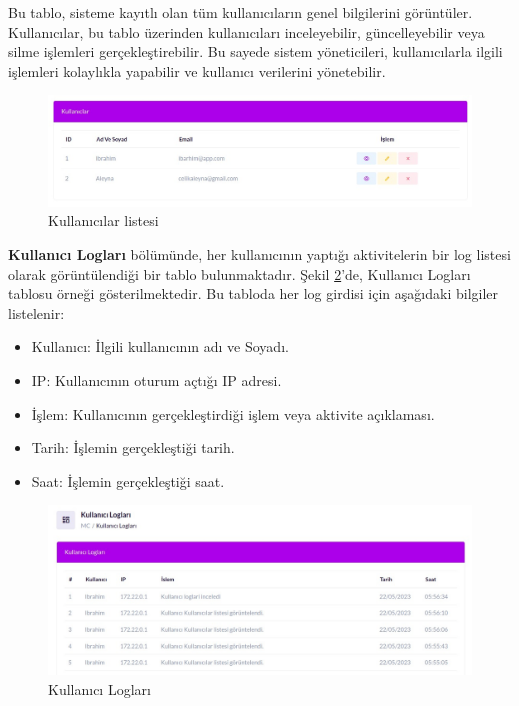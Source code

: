 Bu tablo, sisteme kayıtlı olan tüm kullanıcıların genel bilgilerini görüntüler. Kullanıcılar, bu tablo üzerinden kullanıcıları inceleyebilir, güncelleyebilir veya silme işlemleri gerçekleştirebilir. Bu sayede sistem yöneticileri, kullanıcılarla ilgili işlemleri kolaylıkla yapabilir ve kullanıcı verilerini yönetebilir.
\begin{figure}[ht]
	\centering
	\includegraphics[width=0.7\linewidth]{images/users.jpeg}
	\caption{Kullanıcılar listesi}
	\label{fig:users}
\end{figure}

\textbf{Kullanıcı Logları} bölümünde, her kullanıcının yaptığı aktivitelerin bir log listesi olarak görüntülendiği bir tablo bulunmaktadır. Şekil \ref{fig:log}'de, Kullanıcı Logları tablosu örneği gösterilmektedir.
Bu tabloda her log girdisi için aşağıdaki bilgiler listelenir:
\begin{itemize}
	\item Kullanıcı: İlgili kullanıcının adı ve Soyadı.
	\item IP: Kullanıcının oturum açtığı IP adresi.
	\item İşlem: Kullanıcının gerçekleştirdiği işlem veya aktivite açıklaması.
	\item Tarih: İşlemin gerçekleştiği tarih.
	\item Saat: İşlemin gerçekleştiği saat.
\end{itemize}

\begin{figure}[ht]
	\centering
	\includegraphics[width=0.7\linewidth]{images/log.jpeg}
	\caption{Kullanıcı Logları}
	\label{fig:log}
\end{figure}

